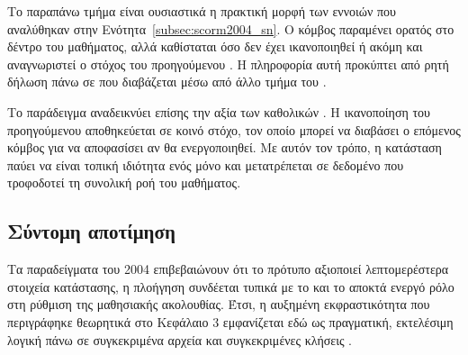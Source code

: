 Το παραπάνω τμήμα είναι ουσιαστικά η πρακτική μορφή των εννοιών που αναλύθηκαν στην Ενότητα~\ref{subsec:scorm2004_sn}. Ο κόμβος  παραμένει ορατός στο δέντρο του μαθήματος, αλλά καθίσταται  όσο δεν έχει ικανοποιηθεί ή ακόμη και αναγνωριστεί ο στόχος του προηγούμενου . Η πληροφορία αυτή προκύπτει από ρητή δήλωση  πάνω σε  που διαβάζεται μέσω  από άλλο τμήμα του .

Το παράδειγμα αναδεικνύει επίσης την αξία των καθολικών . Η ικανοποίηση του προηγούμενου  αποθηκεύεται σε κοινό στόχο, τον οποίο μπορεί να διαβάσει ο επόμενος κόμβος για να αποφασίσει αν θα ενεργοποιηθεί. Με αυτόν τον τρόπο, η κατάσταση παύει να είναι τοπική ιδιότητα ενός μόνο  και μετατρέπεται σε δεδομένο που τροφοδοτεί τη συνολική ροή του μαθήματος.

\subsection{Σύντομη αποτίμηση}
\label{subsec:scorm2004_example_summary}

Τα παραδείγματα του  2004 επιβεβαιώνουν ότι το πρότυπο αξιοποιεί λεπτομερέστερα στοιχεία κατάστασης, η πλοήγηση συνδέεται τυπικά με το   και το  αποκτά ενεργό ρόλο στη ρύθμιση της μαθησιακής ακολουθίας. Έτσι, η αυξημένη εκφραστικότητα που περιγράφηκε θεωρητικά στο Κεφάλαιο 3 εμφανίζεται εδώ ως πραγματική, εκτελέσιμη λογική πάνω σε συγκεκριμένα αρχεία και συγκεκριμένες κλήσεις .
